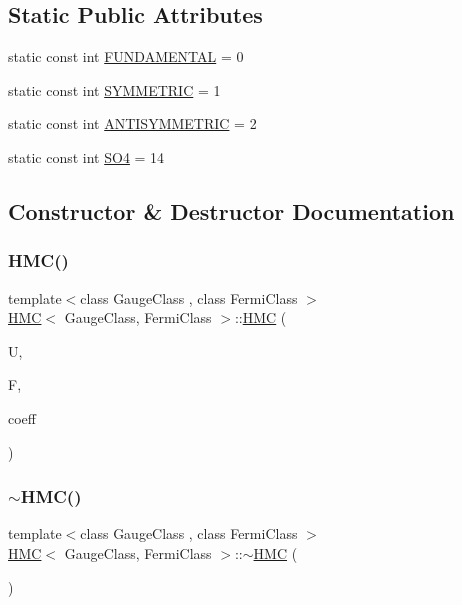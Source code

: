 \subsection*{Static Public Attributes}
\begin{DoxyCompactItemize}
\item 
static const int \hyperlink{class_h_m_c_a5fe0965bb8e3d1220f60979189e86357}{F\+U\+N\+D\+A\+M\+E\+N\+T\+AL} = 0
\item 
static const int \hyperlink{class_h_m_c_adf96eacce9b78dfd329076b35b8544f5}{S\+Y\+M\+M\+E\+T\+R\+IC} = 1
\item 
static const int \hyperlink{class_h_m_c_a2be12d54de2a0c63f56f8a7168780f5d}{A\+N\+T\+I\+S\+Y\+M\+M\+E\+T\+R\+IC} = 2
\item 
static const int \hyperlink{class_h_m_c_ab0bf3c86c692d5f68a0ef2d069f0caf5}{S\+O4} = 14
\end{DoxyCompactItemize}


\subsection{Constructor \& Destructor Documentation}
\mbox{\label{class_h_m_c_aafdc157997f16364f023298ed1de48cb}} 
\subsubsection{\texorpdfstring{H\+M\+C()}{HMC()}}
{\footnotesize\ttfamily template$<$class Gauge\+Class , class Fermi\+Class $>$ \\
\hyperlink{class_h_m_c}{H\+MC}$<$ Gauge\+Class, Fermi\+Class $>$\+::\hyperlink{class_h_m_c}{H\+MC} (\begin{DoxyParamCaption}\item[{Gauge\+Class \&}]{U,  }\item[{Fermi\+Class \&}]{F,  }\item[{\hyperlink{classcoefficients}{coefficients} \&}]{coeff }\end{DoxyParamCaption})\hspace{0.3cm}{\ttfamily [inline]}}

\mbox{\label{class_h_m_c_add3a4a1409a737ccea8c7dae3760d0b3}} 
\subsubsection{\texorpdfstring{$\sim$\+H\+M\+C()}{~HMC()}}
{\footnotesize\ttfamily template$<$class Gauge\+Class , class Fermi\+Class $>$ \\
\hyperlink{class_h_m_c}{H\+MC}$<$ Gauge\+Class, Fermi\+Class $>$\+::$\sim$\hyperlink{class_h_m_c}{H\+MC} (\begin{DoxyParamCaption}{ }\end{DoxyParamCaption})\hspace{0.3cm}{\ttfamily [inline]}}



